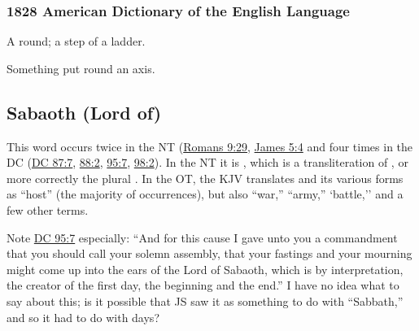 		\subsubsection{1828 American Dictionary of the English Language}

			\begin{compactitem}
				\item[1] A round; a step of a ladder.
				\item[2] Something put round an axis.
			\end{compactitem}


	\subsection{Sabaoth (Lord of)} %
		\label{SABAOTH}
		
		This word occurs twice in the NT (\hyperref[ROMANS-9-29]{Romans 9:29}, \hyperref[JAMES-5-4]{James 5:4} and four times in the DC (\hyperref[DC87-7]{DC 87:7}, \hyperref[DC88-2]{88:2}, \hyperref[DC95-7]{95:7}, \hyperref[DC98-2]{98:2}). In the NT it is , which is a transliteration of , or more correctly the plural . In the OT, the KJV translates  and its various forms as ``host'' (the majority of occurrences), but also ``war,'' ``army,'' `battle,'' and a few other terms.
		
		Note \hyperref[DC95-7]{DC 95:7} especially: ``And for this cause I gave unto you a commandment that you should call your solemn assembly, that your fastings and your mourning might come up into the ears of the Lord of Sabaoth, which is by interpretation, the creator of the first day, the beginning and the end.'' I have no idea what to say about this; is it possible that JS saw it as something to do with ``Sabbath,'' and so it had to do with days?
		
		\subsubsection{\texorpdfstring{}{}} %
			\label{TSAVA} %
		
